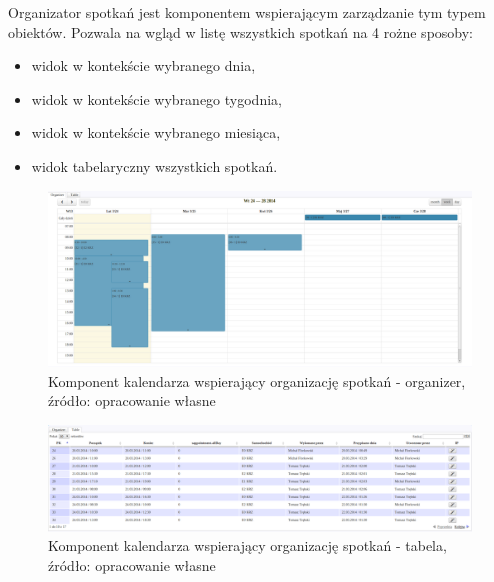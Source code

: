 Organizator spotkań jest komponentem wspierającym zarządzanie tym typem obiektów. 
Pozwala na wgląd w listę wszystkich spotkań na 4 rożne sposoby:
\begin{itemize}
	\item widok w kontekście wybranego dnia,
	\item widok w kontekście wybranego tygodnia,
	\item widok w kontekście wybranego miesiąca,
	\item widok tabelaryczny wszystkich spotkań.
\end{itemize}

\begin{figure}[H]
	\centering
	\includegraphics[width=1.0\textwidth]{images/calendarComponent-organizer}
	\caption[Komponent kalendarza wspierający organizację spotkań - organizer]{
		Komponent kalendarza wspierający organizację spotkań - organizer, źródło: opracowanie własne			
	}
	\label{app:component_calendar_organizer}
\end{figure}
\begin{figure}[H]
	\centering
	\includegraphics[width=1.0\textwidth]{images/calendarComponent-table}
	\caption[Komponent kalendarza wspierający organizację spotkań - tabela]{
		Komponent kalendarza wspierający organizację spotkań - tabela, źródło: opracowanie własne	
	}
	\label{app:component_calendar_table}
\end{figure}	

